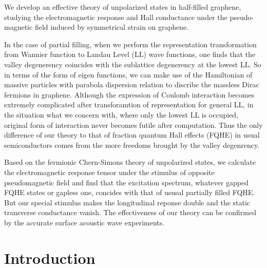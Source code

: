 \documentclass[bachelor,english,numbers]{ustcthesis}
\begin{document}
\begin{enabstract}
	We develop an effective theory of unpolarized states in half-filled graphene, studying the electromagnetic response and Hall conductance under the pseudo-magnetic field induced by symmetrical strain on graphene.\par

	In the case of partial filling, when we perform the representation transformation from Wannier function to Landau Level (LL) wave functions, one finds that the valley degenerency coincides with the sublattice degenerency at the lowest LL. So in terms of the form of eigen functions, we can make use of the Hamiltonian of massive particles with parabola dispersion relation to discribe the massless Dirac fermions in graphene. Although the expression of Coulomb interaction becomes extremely complicated after transforamtion of representation for general LL, in the situation what we concern with, where only the lowest LL is occupied, original form of interaction never becomes futile after computation. Thus the only difference of our theory to that of fraction quantum Hall effects (FQHE) in usual semiconductors comes from the more freedoms brought by the valley degenrency.\par

	Based on the fermionic Chern-Simons theory of unpolarized states, we calculate the electromagnetic response tensor under the stimulus of opposite pseudomagnetic field and find that the excitation spectrum, whatever gapped FQHE states or gapless one, concides with that of ususal partially filled FQHE. But our special stimulus makes the longitudinal reponse double and the static transverse conductance vanish. The effectiveness of our theory can be confirmed by the accurate surface acoustic wave experiments.  

\end{enabstract}


\mainmatter

\chapter{Introduction}
\end{document}
